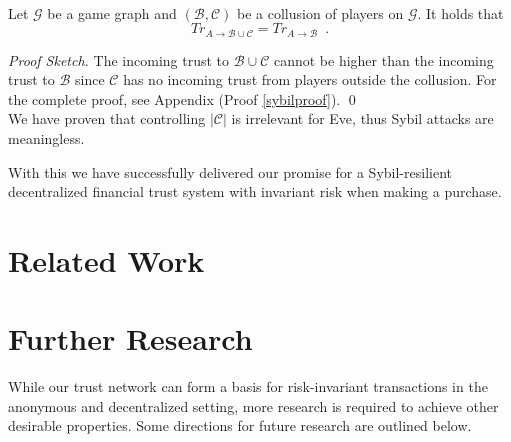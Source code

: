 \documentclass[11pt]{llncs}
\theoremstyle{definition}
\newenvironment{proofsketch}{\textit{Proof Sketch.}}{\qed \bigskip \ \\}
\begin{document}
    \begin{theorem} \ \\
       \label{sybil}
       Let $\mathcal{G}$ be a game graph and $\left(\mathcal{B}, \mathcal{C}\right)$ be a collusion of players on
       $\mathcal{G}$. It holds that
       \begin{equation}
          Tr_{A \rightarrow \mathcal{B} \cup \mathcal{C}} = Tr_{A \rightarrow \mathcal{B}} \enspace.
       \end{equation}
    \end{theorem}
    \begin{proofsketch}
       The incoming trust to $\mathcal{B} \cup \mathcal{C}$ cannot be higher than the incoming trust to $\mathcal{B}$ since
       $\mathcal{C}$ has no incoming trust from players outside the collusion. For the complete proof, see
       Appendix (Proof \ref{sybilproof}).
    \end{proofsketch}
    We have proven that controlling $|\mathcal{C}|$ is irrelevant for Eve, thus Sybil attacks are meaningless.

    With this we have successfully delivered our promise for a Sybil-resilient decentralized financial trust system with
    invariant risk when making a purchase.

  \section{Related Work}

  \section{Further Research}
     While our trust network can form a basis for risk-invariant transactions in the anonymous and decentralized setting,
     more research is required to achieve other desirable properties. Some directions for future research are outlined below.
\end{document}
